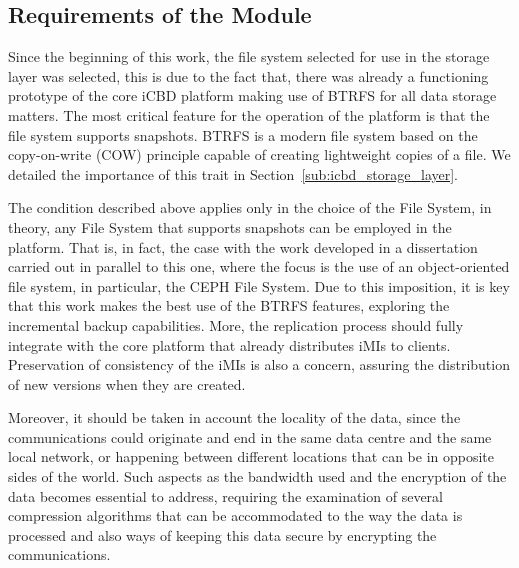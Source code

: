 \subsection{Requirements of the Module}
\label{sub:impl_requirements_icbdrep}

Since the beginning of this work, the file system selected for use in the storage layer was selected, this is due to the fact that, there was already a functioning prototype of the core iCBD platform making use of BTRFS for all data storage matters. The most critical feature for the operation of the platform is that the file system supports snapshots. BTRFS is a modern file system based on the copy-on-write (COW) principle capable of creating lightweight copies of a file. We detailed the importance of this trait in Section~\ref{sub:icbd_storage_layer}.
 
The condition described above applies only in the choice of the File System, in theory, any File System that supports snapshots can be employed in the platform. That is, in fact, the case with the work developed in a dissertation carried out in parallel to this one, where the focus is the use of an object-oriented file system, in particular, the CEPH File System.
Due to this imposition, it is key that this work makes the best use of the BTRFS features, exploring the incremental backup capabilities. More, the replication process should fully integrate with the core platform that already distributes iMIs to clients. Preservation of consistency of the iMIs is also a concern, assuring the distribution of new versions when they are created.

Moreover, it should be taken in account the locality of the data, since the communications could originate and end in the same data centre and the same local network, or happening between different locations that can be in opposite sides of the world. Such aspects as the bandwidth used and the encryption of the data becomes essential to address, requiring the examination of several compression algorithms that can be accommodated to the way the data is processed and also ways of keeping this data secure by encrypting the communications.



